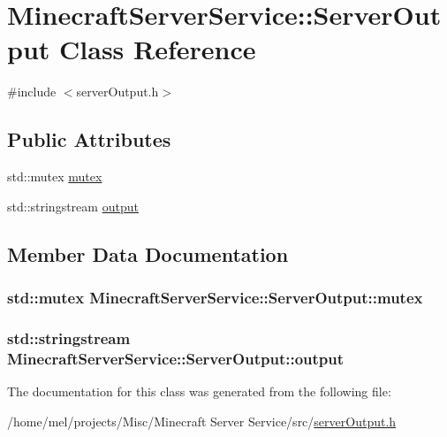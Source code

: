 \hypertarget{class_minecraft_server_service_1_1_server_output}{}\section{Minecraft\+Server\+Service\+:\+:Server\+Output Class Reference}
\label{class_minecraft_server_service_1_1_server_output}


{\ttfamily \#include $<$server\+Output.\+h$>$}

\subsection*{Public Attributes}
\begin{DoxyCompactItemize}
\item 
std\+::mutex \hyperlink{class_minecraft_server_service_1_1_server_output_a056d4d50d9b35adc2fe924e9a6787381}{mutex}
\item 
std\+::stringstream \hyperlink{class_minecraft_server_service_1_1_server_output_a3975c4770147deb36a58ac6e5ef3b61c}{output}
\end{DoxyCompactItemize}


\subsection{Member Data Documentation}
\subsubsection[{\texorpdfstring{mutex}{mutex}}]{\setlength{\rightskip}{0pt plus 5cm}std\+::mutex Minecraft\+Server\+Service\+::\+Server\+Output\+::mutex}\hypertarget{class_minecraft_server_service_1_1_server_output_a056d4d50d9b35adc2fe924e9a6787381}{}\label{class_minecraft_server_service_1_1_server_output_a056d4d50d9b35adc2fe924e9a6787381}
\subsubsection[{\texorpdfstring{output}{output}}]{\setlength{\rightskip}{0pt plus 5cm}std\+::stringstream Minecraft\+Server\+Service\+::\+Server\+Output\+::output}\hypertarget{class_minecraft_server_service_1_1_server_output_a3975c4770147deb36a58ac6e5ef3b61c}{}\label{class_minecraft_server_service_1_1_server_output_a3975c4770147deb36a58ac6e5ef3b61c}


The documentation for this class was generated from the following file\+:\begin{DoxyCompactItemize}
\item 
/home/mel/projects/\+Misc/\+Minecraft Server Service/src/\hyperlink{server_output_8h}{server\+Output.\+h}\end{DoxyCompactItemize}

